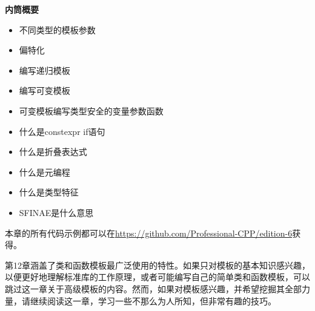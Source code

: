 \noindent
\textbf{内筒概要}

\begin{itemize}
\item
不同类型的模板参数

\item
偏特化

\item
编写递归模板

\item
编写可变模板

\item
可变模板编写类型安全的变量参数函数

\item
什么是constexpr if语句

\item
什么是折叠表达式

\item
什么是元编程

\item
什么是类型特征

\item
SFINAE是什么意思
\end{itemize}

本章的所有代码示例都可以在\url{https://github.com/Professional-CPP/edition-6}获得。

第12章涵盖了类和函数模板最广泛使用的特性。如果只对模板的基本知识感兴趣，以便更好地理解标准库的工作原理，或者可能编写自己的简单类和函数模板，可以跳过这一章关于高级模板的内容。然而，如果对模板感兴趣，并希望挖掘其全部力量，请继续阅读这一章，学习一些不那么为人所知，但非常有趣的技巧。



















